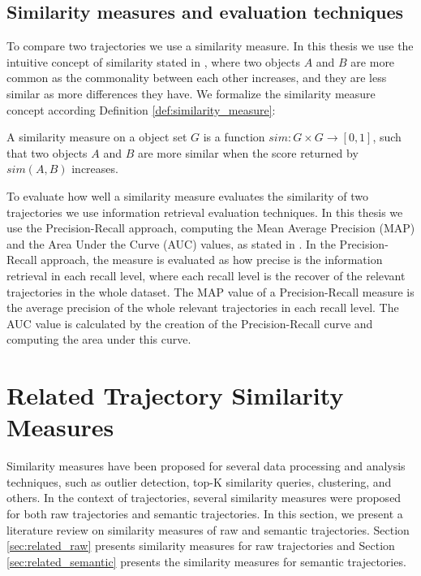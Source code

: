 \subsection{Similarity measures and evaluation techniques}\label{sec:similarity_measures}
To compare two trajectories we use a similarity measure. In this thesis we use the intuitive concept of similarity stated in \cite{lin1998information}, where two objects $A$ and $B$ are more common as the commonality between each other increases, and they are less similar as more differences they have. We formalize the similarity measure concept according Definition \ref{def:similarity_measure}:

\begin{definition}
\label{def:similarity_measure}
A similarity measure on a object set $G$ is a function $sim: G \times G \to [0,1]$, such that two objects $A$ and $B$ are more similar when the score returned by $sim(A, B)$ increases.
\end{definition}

To evaluate how well a similarity measure evaluates the similarity of two trajectories we use information retrieval evaluation techniques. In this thesis we use the Precision-Recall approach, computing the Mean Average Precision (MAP) and the Area Under the Curve (AUC) values, as stated in \cite{BaezaYatesRibeiroNeto2011}. In the Precision-Recall approach, the measure is evaluated as how precise is the information retrieval in each recall level, where each recall level is the recover of the relevant trajectories in the whole dataset. The MAP value of a Precision-Recall measure is the average precision of the whole relevant trajectories in each recall level. The AUC value is calculated by the creation of the Precision-Recall curve and computing the area under this curve.

\section{Related Trajectory Similarity Measures} \label{sec:related_measures}

Similarity measures have been proposed for several data processing and analysis techniques, such as outlier detection, top-K similarity queries, clustering, and others. In the context of trajectories, several similarity measures were proposed for both raw trajectories and semantic trajectories. In this section, we present a literature review on similarity measures of raw and semantic trajectories.
Section \ref{sec:related_raw} presents similarity measures for raw trajectories and Section \ref{sec:related_semantic} presents the similarity measures for semantic trajectories.


